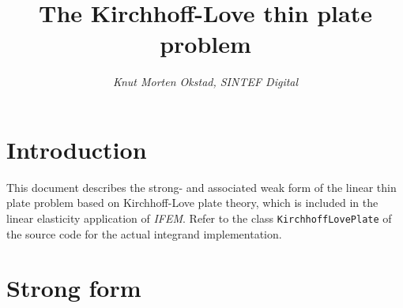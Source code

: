 \documentclass{article}
\title{The Kirchhoff-Love thin plate problem}
\author{\sl Knut Morten Okstad, SINTEF Digital}
\begin{document}
\maketitle

\section{Introduction}

This document describes the strong- and associated weak form of the linear
thin plate problem based on Kirchhoff-Love plate theory, which is included
in the linear elasticity application of {\sl IFEM}.
Refer to the class {\tt KirchhoffLovePlate} of the source code for the actual
integrand implementation.

\section{Strong form}
\end{document}
